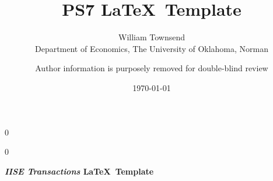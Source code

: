 \documentclass[12pt]{article}
\newcommand{\blind}{0}
\begin{document}
		
		\def\spacingset#1{\renewcommand{\baselinestretch}%
			{#1}\small\normalsize} \spacingset{1}
		
		\blind
		{
			\title{\bf PS7}
			
			\author{ William Townsend  \\
			Department of Economics, The University of Oklahoma, Norman\\
             }
			\date{\today}
			\maketitle
		} \fi
		
		\blind
		{

            \title{\bf \emph{} \LaTeX \ Template}
			\author{Author information is purposely removed for double-blind review}
			
\bigskip
			\bigskip
			\bigskip
			\begin{center}
				{\LARGE\bf \emph{IISE Transactions} \LaTeX \ Template}
			\end{center}
			\medskip
		} \fi
		\bigskip
		
%		
%			
%
\end{document}
